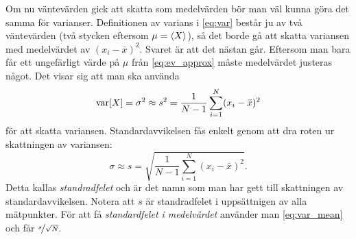 \documentclass[11pt,a4paper, swedish
]{article}
\newcommand{\VAR}[1]{\ensuremath\text{var}\!\left[#1\right]}
\begin{document}
Om nu väntevärden gick att skatta som medelvärden bör man väl kunna
göra det samma för varianser. Definitionen av varians i \eqref{eq:var}
består ju av två väntevärden (två stycken eftersom $\mu=\ev{X}$), så
det borde gå att skatta variansen med medelvärdet av
$(x_i-\bar{x})^2$. Svaret är att det  nästan går. Eftersom man bara
får ett ungefärligt värde på $\mu$ från \eqref{eq:ev_approx} måste
medelvärdet justeras något. Det visar sig att man ska använda
\begin{equation}\label{eq:var_approx}
\VAR{X} = \sigma^2 \approx s^2 = \frac{1}{N-1}\sum_{i=1}^N (x_i-\bar{x})^2
\end{equation}
för att skatta variansen. Standardavvikelsen fås enkelt genom att dra
roten ur skattningen av variansen:
\begin{equation}\label{eq:std_approx}
\sigma \approx s = \sqrt{\frac{1}{N-1}\sum_{i=1}^N (x_i-\bar{x})^2}.
\end{equation}
Detta kallas \emph{standradfelet} och är det namn som man har gett
till skattningen av standardavvikelsen.
Notera att $s$ är standradfelet i uppsättnigen av alla
mätpunkter. För att få \emph{standardfelet i medelvärdet}
använder man \eqref{eq:var_mean} och får $\nicefrac{s}{\sqrt{N}}$.






\newpage
\end{document}
